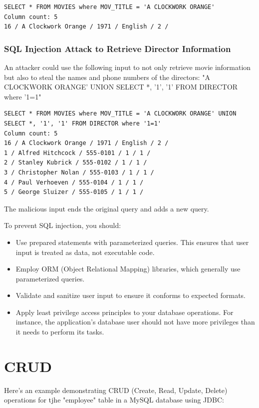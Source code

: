 \begin{verbatim}
SELECT * FROM MOVIES where MOV_TITLE = 'A CLOCKWORK ORANGE'
Column count: 5
16 / A Clockwork Orange / 1971 / English / 2 / 
\end{verbatim}

\subsubsection{SQL Injection Attack to Retrieve Director Information}

An attacker could use the following input to not only retrieve movie information but also to steal the names and phone numbers of the directors: "A CLOCKWORK ORANGE' UNION SELECT *, '1', '1' FROM DIRECTOR where '1=1"

\begin{verbatim}
SELECT * FROM MOVIES where MOV_TITLE = 'A CLOCKWORK ORANGE' UNION SELECT *, '1', '1' FROM DIRECTOR where '1=1'
Column count: 5
16 / A Clockwork Orange / 1971 / English / 2 / 
1 / Alfred Hitchcock / 555-0101 / 1 / 1 / 
2 / Stanley Kubrick / 555-0102 / 1 / 1 / 
3 / Christopher Nolan / 555-0103 / 1 / 1 / 
4 / Paul Verhoeven / 555-0104 / 1 / 1 / 
5 / George Sluizer / 555-0105 / 1 / 1 / 
\end{verbatim}

The malicious input ends the original query and adds a new query. 

To prevent SQL injection, you should:
\begin{itemize}
\item Use prepared statements with parameterized queries. This ensures that user input is treated as data, not executable code.
\item Employ ORM (Object Relational Mapping) libraries, which generally use parameterized queries.
\item Validate and sanitize user input to ensure it conforms to expected formats.
\item Apply least privilege access principles to your database operations. For instance, the application's database user should not have more privileges than it needs to perform its tasks.
\end{itemize}

\section{CRUD}

Here's an  example demonstrating CRUD (Create, Read, Update, Delete) operations for tjhe "employee" table in a MySQL database using JDBC:

